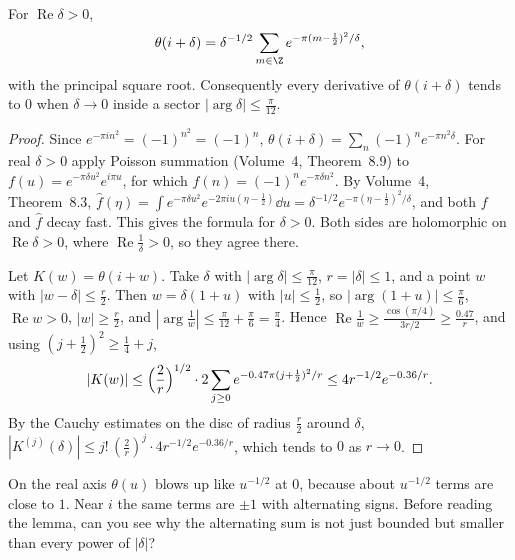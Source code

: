 \begin{lemma}\label{lem:thetai}
For $\operatorname{Re}\delta>0$,
\[
\theta(i+\delta)=\delta^{-1/2}\sum_{m\in\Z}e^{-\pi(m-\frac12)^2/\delta},
\]
with the principal square root. Consequently every derivative of $\theta(i+\delta)$ tends to $0$ when $\delta\to0$ inside a sector $|\arg\delta|\le\frac\pi{12}$.
\end{lemma}
\begin{proof}
Since $e^{-\pi in^2}=(-1)^{n^2}=(-1)^n$, $\theta(i+\delta)=\sum_n(-1)^ne^{-\pi n^2\delta}$. For real $\delta>0$ apply Poisson summation (Volume~4, Theorem~8.9) to $f(u)=e^{-\pi\delta u^2}e^{i\pi u}$, for which $f(n)=(-1)^ne^{-\pi\delta n^2}$. By Volume~4, Theorem~8.3,
$\hat f(\eta)=\int e^{-\pi\delta u^2}e^{-2\pi iu(\eta-\frac12)}\dd u=\delta^{-1/2}e^{-\pi(\eta-\frac12)^2/\delta}$, and both $f$ and $\hat f$ decay fast. This gives the formula for $\delta>0$. Both sides are holomorphic on $\operatorname{Re}\delta>0$, where $\operatorname{Re}\frac1\delta>0$, so they agree there.

Let $K(w)=\theta(i+w)$. Take $\delta$ with $|\arg\delta|\le\frac\pi{12}$, $r=|\delta|\le1$, and a point $w$ with $|w-\delta|\le\frac r2$. Then $w=\delta(1+u)$ with $|u|\le\frac12$, so $|\arg(1+u)|\le\frac\pi6$, $\operatorname{Re}w>0$, $|w|\ge\frac r2$, and $|\arg\frac1w|\le\frac\pi{12}+\frac\pi6=\frac\pi4$. Hence $\operatorname{Re}\frac1w\ge\frac{\cos(\pi/4)}{3r/2}\ge\frac{0.47}r$, and using $(j+\frac12)^2\ge\frac14+j$,
\[
|K(w)|\le\Bigl(\frac2r\Bigr)^{1/2}\cdot2\sum_{j\ge0}e^{-0.47\pi(j+\frac12)^2/r}\le4r^{-1/2}e^{-0.36/r}.
\]
By the Cauchy estimates on the disc of radius $\frac r2$ around $\delta$, $|K^{(j)}(\delta)|\le j!\,(\frac2r)^j\cdot4r^{-1/2}e^{-0.36/r}$, which tends to $0$ as $r\to0$.
\end{proof}

\begin{think}
On the real axis $\theta(u)$ blows up like $u^{-1/2}$ at $0$, because about $u^{-1/2}$ terms are close to $1$. Near $i$ the same terms are $\pm1$ with alternating signs. Before reading the lemma, can you see why the alternating sum is not just bounded but smaller than every power of $|\delta|$?
\end{think}

